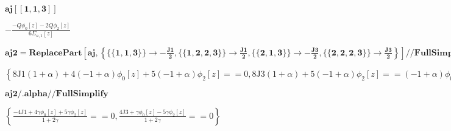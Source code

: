 \documentclass{article}
\begin{document}
\begin{doublespace}
\noindent\(\pmb{\text{aj}[[1,1,3]]}\)
\end{doublespace}

\begin{doublespace}
\noindent\(-\frac{-Q \phi _0[z]-2 Q \phi _2[z]}{6 \Sigma _{a,1}[z]}\)
\end{doublespace}

\begin{doublespace}
\noindent\(\pmb{\text{aj2}=\text{ReplacePart}\left[\text{aj},\left\{\{\{1,1,3\}\}\to -\frac{\text{J1}}{2},\{\{1,2,2,3\}\}\to \frac{\text{J1}}{2},\{\{2,1,3\}\}\to
-\frac{\text{J3}}{2},\{\{2,2,2,3\}\}\to \frac{\text{J3}}{2}\right\}\right]\text{//}\text{FullSimplify}}\)
\end{doublespace}

\begin{doublespace}
\noindent\(\left\{8 \text{J1} (1+\alpha )+4 (-1+\alpha ) \phi _0[z]+5 (-1+\alpha ) \phi _2[z]==0,8 \text{J3} (1+\alpha )+5 (-1+\alpha ) \phi _2[z]==(-1+\alpha
) \phi _0[z]\right\}\)
\end{doublespace}

\begin{doublespace}
\noindent\(\pmb{\text{aj2}\text{/.}\text{alpha}\text{//}\text{FullSimplify}}\)
\end{doublespace}

\begin{doublespace}
\noindent\(\left\{\frac{-4 \text{J1}+4 \gamma  \phi _0[z]+5 \gamma  \phi _2[z]}{1+2 \gamma }==0,\frac{4 \text{J3}+\gamma  \phi _0[z]-5 \gamma  \phi
_2[z]}{1+2 \gamma }==0\right\}\)
\end{doublespace}
\end{document}
